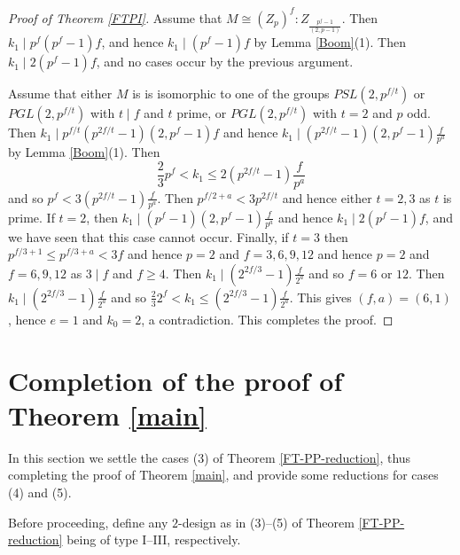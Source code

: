 \documentclass[a4paper,twopage,reqno,12pt]{amsart}
\theoremstyle{definition}
\numberwithin{equation}{section}
\renewcommand{\leq}{\leqslant}
\renewcommand{\geq}{\geqslant}
\begin{document}
\begin{proof}[Proof of Theorem \ref{FTPI}]
Assume that $M\cong \left( Z_{p}\right) ^{f}:Z_{\frac{p^{f}-1}{(2,p-1)}}$. Then $k_{1} \mid p^{f}(p^{f}-1)f$, and hence $%
k_{1}\mid (p^{f}-1)f$ by Lemma \ref{Boom}(1). Then $k_{1}\mid 2(p^{f}-1)f$, and no cases occur by the
previous argument.

Assume that either $M$ is is isomorphic to one of the groups $PSL(2,p^{f/t})$ or $ 
PGL(2,p^{f/t})$ with $t\mid f$ and $t$ prime, or $PGL(2,p^{f/t})$ with $t=2$ and $p$ odd. Then $k_{1} \mid p^{f/t}(p^{2f/t}-1)(2,p^{f}-1)f$ and hence $k_{1}\mid
(p^{2f/t}-1)(2,p^{f}-1)\frac{f}{p^{a}}$ by Lemma \ref{Boom}(1). Then 
\[
\frac{2}{3}p^{f}<k_{1}\leq
2(p^{2f/t}-1)\frac{f}{p^{a}} 
\]%
and so $p^{f}<3(p^{2f/t}-1)\frac{f}{p^{a}}$. Then $p^{f/2+a}<3p^{2f/t}$ and
hence either $t=2,3$ as $t$ is prime. If $t=2$, then $%
k_{1}\mid (p^{f}-1)(2,p^{f}-1)\frac{f}{p^{a}}$ and hence $k_{1}\mid
2(p^{f}-1)f$, and we have seen that this case cannot occur. Finally, if $t=3$ then $p^{f/3+1}\leq p^{f/3+a}<3f$ and hence $p=2$ and $%
f=3,6,9,12$ and hence $p=2$ and $f=6,9,12$ as $3\mid f$ and $f\geq 4$. Then $k_{1}\mid (2^{2f/3}-1)\frac{f}{2^{a}}$ and so $f=6$ or $12$. Then $k_{1}\mid (2^{2f/3}-1)\frac{f}{2^{a}}$ and so $\frac{2}{3}2^f<k_1\leq (2^{2f/3}-1)\frac{f}{2^{a}}$.  This gives $(f,a)=(6,1)$, hence $e=1$ and $k_0=2$, a contradiction. This completes the proof.
\end{proof}


\section{Completion of the proof of Theorem \ref{main}}\label{FT-PP-Geometry-Section}
In this section we settle the cases (3) of Theorem \ref{FT-PP-reduction}, thus completing the proof of Theorem \ref{main}, and provide some reductions for cases (4) and (5).


Before proceeding, define any $2$-design as in (3)--(5) of Theorem \ref{FT-PP-reduction} being of type I--III, respectively. 
\end{document}
